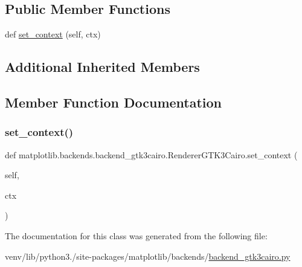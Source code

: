 \subsection*{Public Member Functions}
\begin{DoxyCompactItemize}
\item 
def \hyperlink{classmatplotlib_1_1backends_1_1backend__gtk3cairo_1_1RendererGTK3Cairo_aa1ba21b503ae43d538844d6c65d66378}{set\+\_\+context} (self, ctx)
\end{DoxyCompactItemize}
\subsection*{Additional Inherited Members}


\subsection{Member Function Documentation}
\mbox{\label{classmatplotlib_1_1backends_1_1backend__gtk3cairo_1_1RendererGTK3Cairo_aa1ba21b503ae43d538844d6c65d66378}} 
\subsubsection{\texorpdfstring{set\+\_\+context()}{set\_context()}}
{\footnotesize\ttfamily def matplotlib.\+backends.\+backend\+\_\+gtk3cairo.\+Renderer\+G\+T\+K3\+Cairo.\+set\+\_\+context (\begin{DoxyParamCaption}\item[{}]{self,  }\item[{}]{ctx }\end{DoxyParamCaption})}



The documentation for this class was generated from the following file\+:\begin{DoxyCompactItemize}
\item 
venv/lib/python3./site-\/packages/matplotlib/backends/\hyperlink{backend__gtk3cairo_8py}{backend\+\_\+gtk3cairo.\+py}\end{DoxyCompactItemize}
